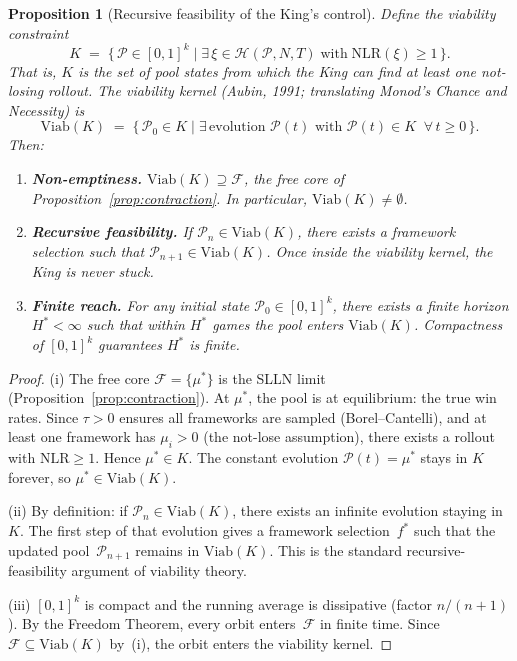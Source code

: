 \documentclass[11pt,a4paper]{article}
\newtheorem{proposition}[theorem]{Proposition}
\newcommand{\cF}{\mathcal{F}}
\newcommand{\cP}{\mathcal{P}}
\newcommand{\cH}{\mathcal{H}}
\begin{document}
\begin{proposition}[Recursive feasibility of the King's control]%
\label{prop:viability}
\color{black!60}%
Define the \emph{viability constraint}
\begin{equation}\label{eq:viability}
  K \;=\; \bigl\{\, \cP \in [0,1]^k \;\big|\;
  \exists\, \xi \in \cH(\cP, N, T) \;\text{with}\;
  \mathrm{NLR}(\xi) \geq 1 \,\bigr\}.
\end{equation}
That is, $K$ is the set of pool states from which the King
can find at least one not-losing rollout.
The \emph{viability kernel}
\textup{(Aubin, 1991; translating Monod's
\emph{Chance and Necessity})}
is
\[
  \mathrm{Viab}(K) \;=\; \bigl\{\, \cP_0 \in K \;\big|\;
  \exists\, \text{evolution } \cP(t) \text{ with }
  \cP(t) \in K \;\;\forall\, t \geq 0 \,\bigr\}.
\]
Then:
\begin{enumerate}[label=\textup{(\roman*)}, nosep]
\item \textbf{Non-emptiness.}\;
  $\mathrm{Viab}(K) \supseteq \cF$, the free core of
  Proposition~\ref{prop:contraction}.
  In particular, $\mathrm{Viab}(K) \neq \emptyset$.

\item \textbf{Recursive feasibility.}\;
  If\/ $\cP_n \in \mathrm{Viab}(K)$, there exists
  a framework selection such that
  $\cP_{n+1} \in \mathrm{Viab}(K)$.
  Once inside the viability kernel, the King is never stuck.

\item \textbf{Finite reach.}\;
  For any initial state $\cP_0 \in [0,1]^k$,
  there exists a finite horizon
  $H^* < \infty$
  such that within $H^*$ games
  the pool enters $\mathrm{Viab}(K)$.
  Compactness of $[0,1]^k$ guarantees $H^*$ is finite.
\end{enumerate}
\end{proposition}

\begin{proof}
\textup{(i)}\;
The free core $\cF = \{\mu^*\}$ is the SLLN limit
(Proposition~\ref{prop:contraction}).
At $\mu^*$, the pool is at equilibrium: the true win rates.
Since $\tau > 0$ ensures all frameworks are sampled
(Borel--Cantelli), and at least one framework has
$\mu_i > 0$ (the not-lose assumption), there exists
a rollout with $\mathrm{NLR} \geq 1$.
Hence $\mu^* \in K$.
The constant evolution $\cP(t) = \mu^*$ stays in $K$
forever, so $\mu^* \in \mathrm{Viab}(K)$.

\medskip\noindent
\textup{(ii)}\;
By definition: if $\cP_n \in \mathrm{Viab}(K)$,
there exists an infinite evolution staying in~$K$.
The first step of that evolution gives a framework
selection~$f^*$ such that the updated pool~$\cP_{n+1}$
remains in $\mathrm{Viab}(K)$.
This is the standard recursive-feasibility argument
of viability theory.

\medskip\noindent
\textup{(iii)}\;
$[0,1]^k$ is compact and the running average is
dissipative (factor $n/(n{+}1)$).
By the Freedom Theorem, every orbit enters~$\cF$
in finite time.
Since $\cF \subseteq \mathrm{Viab}(K)$ by~\textup{(i)},
the orbit enters the viability kernel.
\end{proof}
\end{document}
